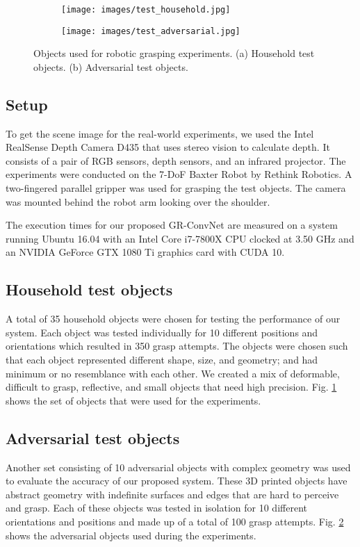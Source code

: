 \documentclass[letterpaper, 10pt, conference]{IEEEtran}
\begin{document}
\begin{figure}
\vspace*{0.1cm}
\begin{subfigure}{.24\textwidth}
  \centering
  \texttt{[image: images/test\_household.jpg]}  
  \caption{}
  \label{fig:household_objects}
\end{subfigure}
\begin{subfigure}{.24\textwidth}
  \centering
  \texttt{[image: images/test\_adversarial.jpg]}  
  \caption{}
  \label{fig:adversarial_objects}
\end{subfigure}
\caption{Objects used for robotic grasping experiments. (a) Household test objects. (b) Adversarial test objects.}
\label{fig:test_objects}
\end{figure}

\subsection{Setup}
To get the scene image for the real-world experiments, we used the Intel RealSense Depth Camera D435 that uses stereo vision to calculate depth. It consists of a pair of RGB sensors, depth sensors, and an infrared projector. The experiments were conducted on the 7-DoF Baxter Robot by Rethink Robotics. A two-fingered parallel gripper was used for grasping the test objects. The camera was mounted behind the robot arm looking over the shoulder.

The execution times for our proposed GR-ConvNet are measured on a system running Ubuntu 16.04 with an Intel Core i7-7800X CPU clocked at 3.50 GHz and an NVIDIA GeForce GTX 1080 Ti graphics card with CUDA 10.

\subsection{Household test objects}
A total of 35 household objects were chosen for testing the performance of our system. Each object was tested individually for 10 different positions and orientations which resulted in 350 grasp attempts. The objects were chosen such that each object represented different shape, size, and geometry; and had minimum or no resemblance with each other. We created a mix of deformable, difficult to grasp, reflective, and small objects that need high precision. Fig. \ref{fig:household_objects} shows the set of objects that were used for the experiments.

\subsection{Adversarial test objects}
Another set consisting of 10 adversarial objects with complex geometry was used to evaluate the accuracy of our proposed system. These 3D printed objects have abstract geometry with indefinite surfaces and edges that are hard to perceive and grasp. Each of these objects was tested in isolation for 10 different orientations and positions and made up of a total of 100 grasp attempts. Fig. \ref{fig:adversarial_objects} shows the adversarial objects used during the experiments.
\end{document}

